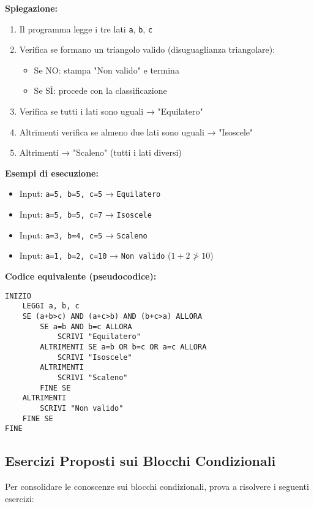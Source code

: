 \documentclass[a4paper,16pt]{article}
\begin{document}
\textbf{Spiegazione:}
\begin{enumerate}
    \item Il programma legge i tre lati \texttt{a}, \texttt{b}, \texttt{c}
    \item Verifica se formano un triangolo valido (disuguaglianza triangolare):
    \begin{itemize}
        \item Se NO: stampa "Non valido" e termina
        \item Se SÌ: procede con la classificazione
    \end{itemize}
    \item Verifica se tutti i lati sono uguali → "Equilatero"
    \item Altrimenti verifica se almeno due lati sono uguali → "Isoscele"
    \item Altrimenti → "Scaleno" (tutti i lati diversi)
\end{enumerate}

\textbf{Esempi di esecuzione:}
\begin{itemize}
    \item Input: \texttt{a=5, b=5, c=5} → \texttt{Equilatero}
    \item Input: \texttt{a=5, b=5, c=7} → \texttt{Isoscele}
    \item Input: \texttt{a=3, b=4, c=5} → \texttt{Scaleno}
    \item Input: \texttt{a=1, b=2, c=10} → \texttt{Non valido} ($1+2 \not> 10$)
\end{itemize}

\textbf{Codice equivalente (pseudocodice):}
\begin{lstlisting}
INIZIO
    LEGGI a, b, c
    SE (a+b>c) AND (a+c>b) AND (b+c>a) ALLORA
        SE a=b AND b=c ALLORA
            SCRIVI "Equilatero"
        ALTRIMENTI SE a=b OR b=c OR a=c ALLORA
            SCRIVI "Isoscele"
        ALTRIMENTI
            SCRIVI "Scaleno"
        FINE SE
    ALTRIMENTI
        SCRIVI "Non valido"
    FINE SE
FINE
\end{lstlisting}

\newpage
\subsection{Esercizi Proposti sui Blocchi Condizionali}

Per consolidare le conoscenze sui blocchi condizionali, prova a risolvere i seguenti esercizi:
\end{document}
